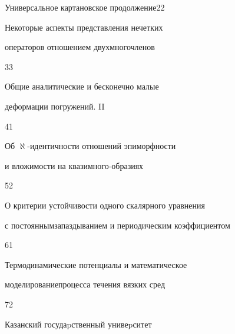 

{Универсальное картановское продолжение}{22}


 




{Некоторые аспекты представления нечетких


операторов отношением двух\newline многочленов}{33}







{Общие аналитические и бесконечно малые


деформации погружений. {\rm II}}{41}


 




{Об $\aleph$-идентичности отношений эпиморфности


и вложимости на квазимного-\newline образиях}{52}







{О критерии устойчивости одного скалярного уравнения


с постоянным\newline запаздыванием и периодическим коэффициентом}{61}







{Термодинамические потенциалы и математическое


моделирование\newline процесса течения вязких сред}{72}




















\vfill


\noindent\raisebox{2pt}{\copyright} Казанский госудаpственный унивеpситет





